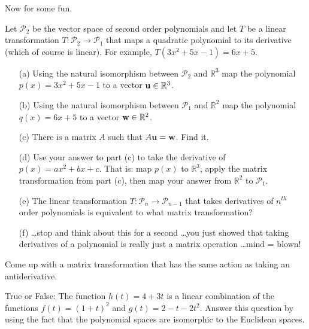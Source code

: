 Now for some fun.
\begin{problem}
    Let $\mathcal{P}_2$ be the vector space of second order polynomials and let $T$ be a linear
    transformation $T:\mathcal{P}_2 \to \mathcal{P}_1$ that maps a quadratic polynomial to its
    derivative (which of course is linear).  For example, $T(3x^2+5x-1) = 6x+5$.
    \begin{enumerate}
        \item[(a)] Using the natural isomorphism between $\mathcal{P}_2$ and
            $\mathbb{R}^3$ map the polynomial $p(x) = 3x^2 + 5x - 1$ to a vector
            ${\bf u} \in \mathbb{R}^3$. 
        \item[(b)] Using the natural isomorphism between $\mathcal{P}_1$ and
            $\mathbb{R}^2$ map the polynomial $q(x) = 6x+5$ to a vector ${\bf w} \in \mathbb{R}^2$.
        \item[(c)] There is a matrix $A$ such that $A {\bf u} = {\bf w}$.  Find it.
        \item[(d)] Use your answer to part (c) to take the derivative of $p(x) = ax^2 + bx
            + c$.  That is: map $p(x)$ to $\mathbb{R}^3$, apply the matrix transformation
            from part (c), then map your answer from $\mathbb{R}^2$ to $\mathcal{P}_1$.
        \item[(e)] The linear transformation $T:\mathcal{P}_{n} \to \mathcal{P}_{n-1}$
            that takes derivatives of $n^{th}$ order polynomials is equivalent to what
            matrix transformation?
        \item[(f)] \ldots stop and think about this for a second \ldots you just showed
            that taking derivatives of a polynomial is really just a matrix operation
            \ldots mind = blown!
    \end{enumerate}
\end{problem}


\begin{problem}
    Come up with a matrix transformation that has the same action as taking an
    antiderivative.
\end{problem}



\begin{problem}
    True or False: The function $h(t) = 4+3t$ is a linear combination of the functions
    $f(t) = (1+t)^2$ and $g(t) = 2 - t - 2t^2$.  Answer this question by using the fact
    that the polynomial spaces are isomorphic to the Euclidean spaces.
\end{problem}

